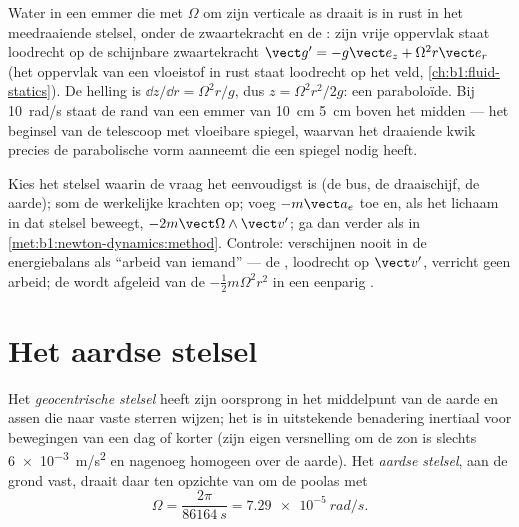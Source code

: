 \begin{example}\label{ex:b1:non-inertial-frames:bucket}
Water in een emmer die met $\Omega$ om zijn verticale as draait is in rust
in het meedraaiende stelsel, onder de zwaartekracht en de : zijn vrije
oppervlak staat loodrecht op de schijnbare zwaartekracht $\vect g' = -g\vect e_z +
\Omega^2r\vect e_r$ (het oppervlak van een vloeistof in rust staat loodrecht op het veld,
\cref{ch:b1:fluid-statics}). De helling is $\dd z/\dd r = \Omega^2r/g$, dus
$z = \Omega^2r^2/2g$: een paraboloïde. Bij \qty{10}{rad/s} staat de rand van een
emmer van \qty{10}{cm} \qty{5}{cm} boven het midden --- het beginsel
van de telescoop met vloeibare spiegel, waarvan het draaiende kwik precies
de parabolische vorm aanneemt die een spiegel nodig heeft.
\end{example}

\begin{method}\label{met:b1:non-inertial-frames:method}
Kies het stelsel waarin de vraag het eenvoudigst is (de bus, de
draaischijf, de aarde); som de werkelijke krachten op; voeg $-m\vect a_e$ toe en, als het
lichaam in dat stelsel beweegt, $-2m\vect\Omega\wedge\vect v'$; ga dan verder als in
\cref{met:b1:newton-dynamics:method}. Controle:  verschijnen
nooit in de energiebalans als ``arbeid van iemand'' --- de ,
loodrecht op $\vect v'$, verricht geen arbeid; de 
wordt afgeleid van de  $-\tfrac12 m\Omega^2r^2$ in een eenparig
.
\end{method}

\section{Het aardse stelsel}

\begin{definition}\label{def:b1:non-inertial-frames:earth}
Het \emph{geocentrische stelsel} heeft zijn oorsprong in het middelpunt van de aarde en
assen die naar vaste sterren wijzen; het is in uitstekende benadering
inertiaal voor bewegingen van een dag of korter (zijn eigen versnelling om
de zon is slechts \qty{6e-3}{m/s^2} en nagenoeg homogeen over de aarde).
Het \emph{aardse stelsel}, aan de grond vast, draait daar ten opzichte van
om de poolas met
\[
\Omega = \frac{2\pi}{\qty{86164}{s}} = \qty{7.29e-5}{rad/s} .
\]
\end{definition}

